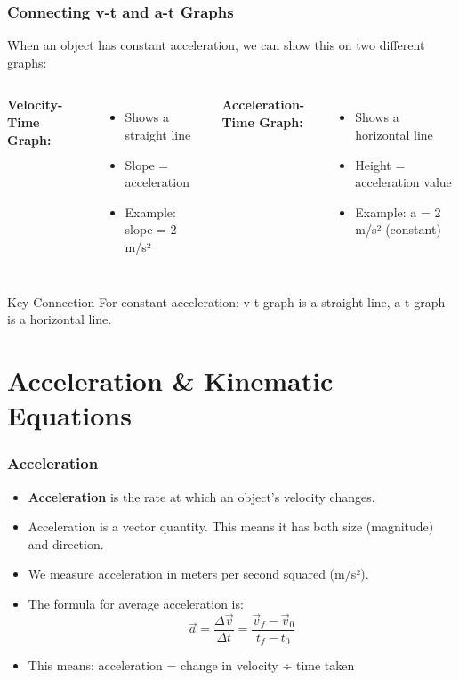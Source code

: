 \documentclass{beamer}
\begin{document}
\begin{frame}
\frametitle{Connecting v-t and a-t Graphs}
When an object has constant acceleration, we can show this on two different graphs:
\pause
\begin{columns}
\textbf{Velocity-Time Graph:}
\begin{itemize}
    \item Shows a straight line
    \item Slope = acceleration
    \item Example: slope = 2 m/s²
\end{itemize}
\textbf{Acceleration-Time Graph:}
\begin{itemize}
    \item Shows a horizontal line
    \item Height = acceleration value
    \item Example: a = 2 m/s² (constant)
\end{itemize}
\end{columns}
\vspace{1em}
\pause
\begin{alertblock}{Key Connection}
For constant acceleration: v-t graph is a straight line, a-t graph is a horizontal line.
\end{alertblock}
\end{frame}

\section{Acceleration \& Kinematic Equations}

\begin{frame}
\frametitle{Acceleration}
\begin{itemize}
    \item \textbf{Acceleration} is the rate at which an object's velocity changes.
    \pause
    \item Acceleration is a \alert{vector} quantity. This means it has both size (magnitude) and direction.
    \pause
    \item We measure acceleration in meters per second squared (m/s²).
    \pause
    \item The formula for average acceleration is:
    \[ \vec{a} = \frac{\Delta \vec{v}}{\Delta t} = \frac{\vec{v}_f - \vec{v}_0}{t_f - t_0} \]
    \pause
    \item This means: acceleration = change in velocity ÷ time taken
\end{itemize}
\end{frame}
\end{document}
